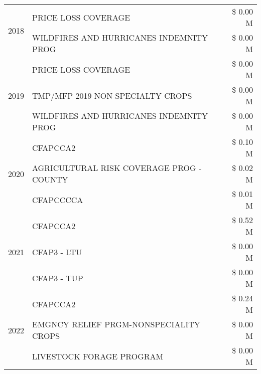\begin{tabular}{llr}
\cline{1-3}
\multirow[t]{2}{*}{2018} & PRICE LOSS COVERAGE & \$ 0.00 M \\
 & WILDFIRES AND HURRICANES INDEMNITY PROG & \$ 0.00 M \\
\cline{1-3}
\multirow[t]{3}{*}{2019} & PRICE LOSS COVERAGE & \$ 0.00 M \\
 & TMP/MFP 2019 NON SPECIALTY CROPS & \$ 0.00 M \\
 & WILDFIRES AND HURRICANES INDEMNITY PROG & \$ 0.00 M \\
\cline{1-3}
\multirow[t]{3}{*}{2020} & CFAPCCA2 & \$ 0.10 M \\
 & AGRICULTURAL RISK COVERAGE PROG - COUNTY & \$ 0.02 M \\
 & CFAPCCCCA & \$ 0.01 M \\
\cline{1-3}
\multirow[t]{3}{*}{2021} & CFAPCCA2 & \$ 0.52 M \\
 & CFAP3 - LTU & \$ 0.00 M \\
 & CFAP3 - TUP & \$ 0.00 M \\
\cline{1-3}
\multirow[t]{3}{*}{2022} & CFAPCCA2 & \$ 0.24 M \\
 & EMGNCY RELIEF PRGM-NONSPECIALITY CROPS & \$ 0.00 M \\
 & LIVESTOCK FORAGE PROGRAM & \$ 0.00 M \\
\cline{1-3}
\bottomrule
\end{tabular}
